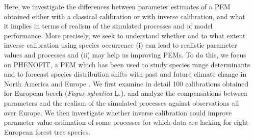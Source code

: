 \documentclass[letterpaper,8pt]{extarticle}  %
\begin{document}
\begin{doublespacing}
\begin{linenumbers}
Here, we investigate the differences between parameter estimates of a PEM obtained either with a classical calibration or with inverse calibration, and what it implies in terms of realism of the simulated processes and of model performance. More precisely, we seek to understand whether and to what extent inverse calibration using species occurrence (i) can lead to realistic parameter values and processes and (ii) may help us improving PEMs. To do this, we focus on PHENOFIT, a PEM which has been used to study species range determinants and to forecast species distribution shifts with past and future climate change in North America and Europe
\citep{Morin2007, Saltre2013, Saltre2015, Cheaib2012}. We first examine in detail 100 calibrations obtained for European beech (\emph{Fagus sylvatica} L.), and analyze the compensations between parameters and the realism of the simulated processes against observations all over Europe. We then investigate whether inverse calibration could improve parameter value estimation of some processes for which data are lacking for eight European forest tree species. 






\end{linenumbers}
\end{doublespacing}
\end{document}
